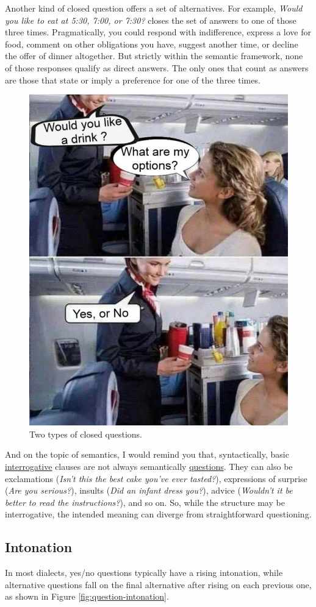 Another kind of closed question offers a set of alternatives. For example, \textit{Would you like to eat at 5:30, 7:00, or 7:30?} closes the set of answers to one of those three times. Pragmatically, you could respond with indifference, express a love for food, comment on other obligations you have, suggest another time, or decline the offer of dinner altogether. But strictly within the semantic framework, none of those responses qualify as direct answers. The only ones that count as answers are those that state or imply a preference for one of the three times.

\begin{figure}
    \centering
    \includegraphics[width=0.5\linewidth]{figures/closedInterrogativesMeme.jpg}
    \caption{Two types of closed questions.}
    \label{fig:closed-int-meme}
\end{figure}

And on the topic of semantics, I would remind you that, syntactically, basic \uline{interrogative} clauses are not always semantically \uline{questions}. They can also be exclamations (\textit{Isn't this the best cake you've ever tasted?}), expressions of surprise (\textit{Are you serious?}), insults (\textit{Did an infant dress you?}), advice (\textit{Wouldn't it be better to read the instructions?}), and so on. So, while the structure may be interrogative, the intended meaning can diverge from straightforward questioning.

\subsection{Intonation}

In most dialects, yes/no questions typically have a rising intonation, while alternative questions fall on the final alternative after rising on each previous one, as shown in Figure \ref{fig:question-intonation}.

